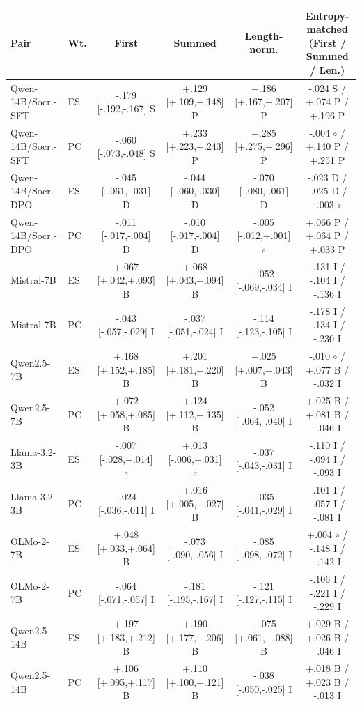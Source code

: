 \begin{table}[t]
\centering\scriptsize
\setlength{\tabcolsep}{5pt}
\begin{tabular}{@{}llcccc@{}}
\toprule
Pair & Wt. & First & Summed & Length-norm. & Entropy-matched (First / Summed / Len.) \\
\midrule
Qwen-14B/Socr.-SFT & ES & -.179 [-.192,-.167] S & +.129 [+.109,+.148] P & +.186 [+.167,+.207] P & -.024 S / +.074 P / +.196 P \\
Qwen-14B/Socr.-SFT & PC & -.060 [-.073,-.048] S & +.233 [+.223,+.243] P & +.285 [+.275,+.296] P & -.004 $\circ$ / +.140 P / +.251 P \\
Qwen-14B/Socr.-DPO & ES & -.045 [-.061,-.031] D & -.044 [-.060,-.030] D & -.070 [-.080,-.061] D & -.023 D / -.025 D / -.003 $\circ$ \\
Qwen-14B/Socr.-DPO & PC & -.011 [-.017,-.004] D & -.010 [-.017,-.004] D & -.005 [-.012,+.001] $\circ$ & +.066 P / +.064 P / +.033 P \\
Mistral-7B & ES & +.067 [+.042,+.093] B & +.068 [+.043,+.094] B & -.052 [-.069,-.034] I & -.131 I / -.104 I / -.136 I \\
Mistral-7B & PC & -.043 [-.057,-.029] I & -.037 [-.051,-.024] I & -.114 [-.123,-.105] I & -.178 I / -.134 I / -.230 I \\
Qwen2.5-7B & ES & +.168 [+.152,+.185] B & +.201 [+.181,+.220] B & +.025 [+.007,+.043] B & -.010 $\circ$ / +.077 B / -.032 I \\
Qwen2.5-7B & PC & +.072 [+.058,+.085] B & +.124 [+.112,+.135] B & -.052 [-.064,-.040] I & +.025 B / +.081 B / -.046 I \\
Llama-3.2-3B & ES & -.007 [-.028,+.014] $\circ$ & +.013 [-.006,+.031] $\circ$ & -.037 [-.043,-.031] I & -.110 I / -.094 I / -.093 I \\
Llama-3.2-3B & PC & -.024 [-.036,-.011] I & +.016 [+.005,+.027] B & -.035 [-.041,-.029] I & -.101 I / -.057 I / -.081 I \\
OLMo-2-7B & ES & +.048 [+.033,+.064] B & -.073 [-.090,-.056] I & -.085 [-.098,-.072] I & +.004 $\circ$ / -.148 I / -.142 I \\
OLMo-2-7B & PC & -.064 [-.071,-.057] I & -.181 [-.195,-.167] I & -.121 [-.127,-.115] I & -.106 I / -.221 I / -.229 I \\
Qwen2.5-14B & ES & +.197 [+.183,+.212] B & +.190 [+.177,+.206] B & +.075 [+.061,+.088] B & +.029 B / +.026 B / -.046 I \\
Qwen2.5-14B & PC & +.106 [+.095,+.117] B & +.110 [+.100,+.121] B & -.038 [-.050,-.025] I & +.018 B / +.023 B / -.013 I \\

\end{tabular}
\end{table}
